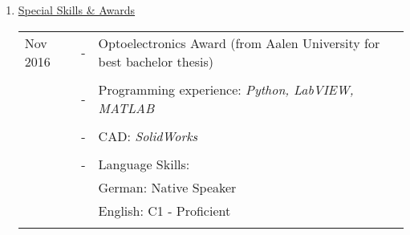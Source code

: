 \begin{enumerate}[label=\Alph*.]
	\pagebreak
	\item \underline{Special Skills \& Awards}
	
	\begin{tabulary}{\textwidth}{@{}p{3.8cm}CL}
		Nov 2016 & - & Optoelectronics Award (from Aalen University for best bachelor thesis)\\
		\\[-0.5em]
		& - & Programming experience: \textit{Python, LabVIEW, MATLAB}\\
		\\[-0.5em]
		& - & CAD: \textit{SolidWorks}\\
		\\[-0.5em]
		& - & Language Skills: \\
		& & German: Native Speaker\\
		& & English: C1 - Proficient \\
		\\[-0.5em]
		
	\end{tabulary}
	
\end{enumerate}
